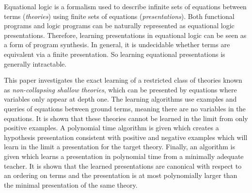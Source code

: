 Equational logic is a formalism used to describe infinite sets of equations between terms (\emph{theories}) using finite sets of equations (\emph{presentations}). 
Both functional programs and logic programs can be naturally represented as equational logic presentations. 
Therefore, learning presentations in equational logic can be seen as a form of program synthesis. 
In general, it is undecidable whether terms are equivalent via a finite presentation.
So learning equational presentations is generally intractable. 

This paper investigates the exact learning of a restricted class of theories known as \emph{non-collapsing shallow theories}, which can be presented by equations where variables only appear at depth one. 
The learning algorithms use examples and queries of equations between ground terms, meaning there are no variables in the equations.
It is shown that these theories cannot be learned in the limit from only positive examples. 
A polynomial time algorithm is given which creates a hypothesis presentation consistent with positive and negative examples which will learn in the limit a presentation for the target theory.
Finally, an algorithm is given which learns a presentation in polynomial time from a minimally adequate teacher.
It is shown that the learned presentations are canonical with respect to an ordering on terms and the presentation is at most polynomially larger than the minimal presentation of the same theory.